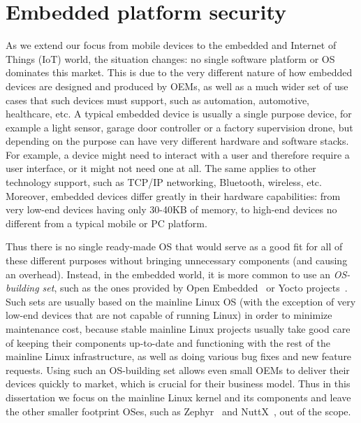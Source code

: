 \section{Embedded platform security}

As we extend our focus from mobile devices to the embedded and Internet of Things (IoT) world, the situation changes: no single software platform or OS dominates this market. This is due to the very different nature of how embedded devices are designed and produced by OEMs, as well as a much wider set of use cases that such devices must support, such as automation, automotive, healthcare, etc. A typical embedded device is usually a single purpose device, for example a light sensor, garage door controller or a factory supervision drone, but depending on the purpose can have very different hardware and software stacks. For example, a device might need to interact with a user and therefore require a user interface, or it might not need one at all. The same applies to other technology support, such as TCP/IP networking, Bluetooth, wireless, etc. Moreover, embedded devices differ greatly in their hardware capabilities: from very low-end devices having only 30-40KB of memory, to high-end devices no different from a typical mobile or PC platform.

Thus there is no single ready-made OS that would serve as a good fit for all of these different purposes without bringing unnecessary components (and causing an overhead). Instead, in the embedded world, it is more common to use an \textit{OS-building set}, such as the ones provided by Open Embedded~\cite{OE2017} or Yocto projects~\cite{yocto2017}. Such sets are usually based on the mainline Linux OS (with the exception of very low-end devices that are not capable of running Linux) in order to minimize maintenance cost, because stable mainline Linux projects usually take good care of keeping their components up-to-date and functioning with the rest of the mainline Linux infrastructure, as well as doing various bug fixes and new feature requests. Using such an OS-building set allows even small OEMs to deliver their devices quickly to market, which is crucial for their business model. Thus in this dissertation we focus on the mainline Linux kernel and its components and leave the other smaller footprint OSes, such as Zephyr~\cite{zephyr} and NuttX~\cite{NuttX}, out of the scope. 

